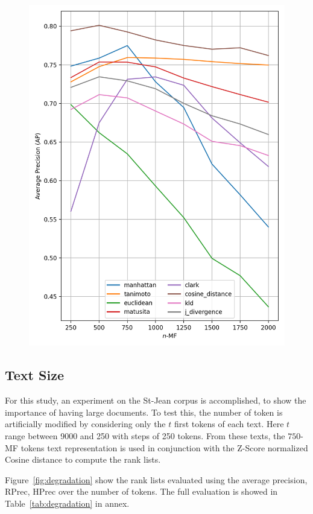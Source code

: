 \begin{figure}
  \label{fig:lemmas}
  \includegraphics[width=0.9\linewidth]{img/mf_lemmas.png}
\end{figure}

\subsection{Text Size\label{sec:importance_of_text_size}}

For this study, an experiment on the St-Jean corpus is accomplished, to show the importance of having large documents.
To test this, the number of token is artificially modified by considering only the $t$ first tokens of each text.
Here $t$ range between 9000 and 250 with steps of 250 tokens.
From these texts, the $750$-MF tokens text representation is used in conjunction with the Z-Score normalized Cosine distance to compute the rank lists.

Figure~\ref{fig:degradation} show the rank lists evaluated using the average precision, RPrec, HPrec over the number of tokens.
The full evaluation is showed in Table~\ref{tab:degradation} in annex.

